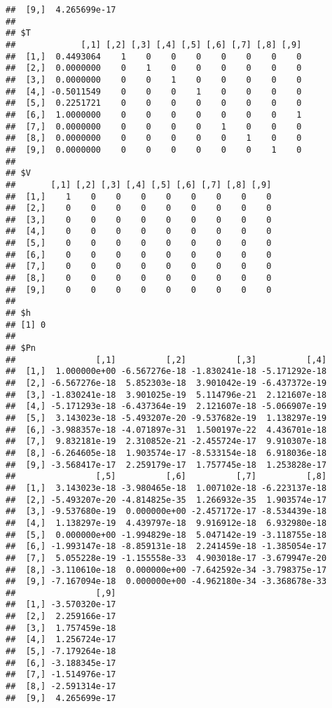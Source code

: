 \documentclass[]{article}
\begin{document}
\begin{verbatim}
##  [9,]  4.265699e-17
## 
## $T
##             [,1] [,2] [,3] [,4] [,5] [,6] [,7] [,8] [,9]
##  [1,]  0.4493064    1    0    0    0    0    0    0    0
##  [2,]  0.0000000    0    1    0    0    0    0    0    0
##  [3,]  0.0000000    0    0    1    0    0    0    0    0
##  [4,] -0.5011549    0    0    0    1    0    0    0    0
##  [5,]  0.2251721    0    0    0    0    0    0    0    0
##  [6,]  1.0000000    0    0    0    0    0    0    0    1
##  [7,]  0.0000000    0    0    0    0    1    0    0    0
##  [8,]  0.0000000    0    0    0    0    0    1    0    0
##  [9,]  0.0000000    0    0    0    0    0    0    1    0
## 
## $V
##       [,1] [,2] [,3] [,4] [,5] [,6] [,7] [,8] [,9]
##  [1,]    1    0    0    0    0    0    0    0    0
##  [2,]    0    0    0    0    0    0    0    0    0
##  [3,]    0    0    0    0    0    0    0    0    0
##  [4,]    0    0    0    0    0    0    0    0    0
##  [5,]    0    0    0    0    0    0    0    0    0
##  [6,]    0    0    0    0    0    0    0    0    0
##  [7,]    0    0    0    0    0    0    0    0    0
##  [8,]    0    0    0    0    0    0    0    0    0
##  [9,]    0    0    0    0    0    0    0    0    0
## 
## $h
## [1] 0
## 
## $Pn
##                [,1]          [,2]          [,3]          [,4]
##  [1,]  1.000000e+00 -6.567276e-18 -1.830241e-18 -5.171292e-18
##  [2,] -6.567276e-18  5.852303e-18  3.901042e-19 -6.437372e-19
##  [3,] -1.830241e-18  3.901025e-19  5.114796e-21  2.121607e-18
##  [4,] -5.171293e-18 -6.437364e-19  2.121607e-18 -5.066907e-19
##  [5,]  3.143023e-18 -5.493207e-20 -9.537682e-19  1.138297e-19
##  [6,] -3.988357e-18 -4.071897e-31  1.500197e-22  4.436701e-18
##  [7,]  9.832181e-19  2.310852e-21 -2.455724e-17  9.910307e-18
##  [8,] -6.264605e-18  1.903574e-17 -8.533154e-18  6.918036e-18
##  [9,] -3.568417e-17  2.259179e-17  1.757745e-18  1.253828e-17
##                [,5]          [,6]          [,7]          [,8]
##  [1,]  3.143023e-18 -3.980465e-18  1.007102e-18 -6.223137e-18
##  [2,] -5.493207e-20 -4.814825e-35  1.266932e-35  1.903574e-17
##  [3,] -9.537680e-19  0.000000e+00 -2.457172e-17 -8.534439e-18
##  [4,]  1.138297e-19  4.439797e-18  9.916912e-18  6.932980e-18
##  [5,]  0.000000e+00 -1.994829e-18  5.047142e-19 -3.118755e-18
##  [6,] -1.993147e-18 -8.859131e-18  2.241459e-18 -1.385054e-17
##  [7,]  5.055228e-19 -1.155558e-33  4.903018e-17 -3.679947e-20
##  [8,] -3.110610e-18  0.000000e+00 -7.642592e-34 -3.798375e-17
##  [9,] -7.167094e-18  0.000000e+00 -4.962180e-34 -3.368678e-33
##                [,9]
##  [1,] -3.570320e-17
##  [2,]  2.259166e-17
##  [3,]  1.757459e-18
##  [4,]  1.256724e-17
##  [5,] -7.179264e-18
##  [6,] -3.188345e-17
##  [7,] -1.514976e-17
##  [8,] -2.591314e-17
##  [9,]  4.265699e-17
\end{verbatim}
\end{document}
